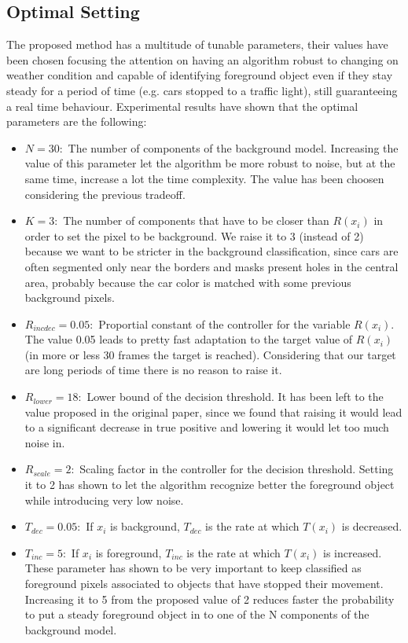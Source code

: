 \subsection{Optimal Setting}
The proposed method has a multitude of tunable parameters, their values have been chosen focusing the attention on having an algorithm robust to changing on weather condition and capable of identifying foreground object even if they stay steady for a period of time (e.g. cars stopped to a traffic light), still guaranteeing a real time behaviour. \newline
Experimental results have shown that the optimal parameters are the following:
\begin{itemize}
\item $N = 30:$ The number of components of the
background model. Increasing the value of this parameter let the algorithm be more robust to noise, but at the same time, increase a lot the time complexity. The value has been choosen considering the previous tradeoff.
\item $K = 3:$ The number of components that have to be closer than $R(x_i)$ in order to set the pixel to be background. We raise it to 3 (instead of 2) because we want to be stricter in the background classification, since cars are often segmented only near the borders and masks present holes in the central area, probably because the car color is matched with some previous background pixels.
\item $R_{incdec} = 0.05:$ Proportial constant of the controller for the variable $R(x_i)$. The value 0.05 leads to pretty fast adaptation to the target value of $R(x_i)$ (in more or less 30 frames the target is reached). Considering that our target are long periods of time there is no reason to raise it.
\item $R_{lower}=18:$ Lower bound of the decision threshold. It has been left to the value proposed in the original paper, since we found that raising it would lead to a significant decrease in true positive and lowering it would let too much noise in.
\item $R_{scale}=2:$ Scaling factor in the controller for the decision threshold. Setting it to 2 has shown to let the algorithm recognize better the foreground object while introducing very low noise.
\item $T_{dec} = 0.05:$ If $x_i$ is background, $T_{dec}$ is the rate at which $T(x_i)$ is decreased.
\item $T_{inc} = 5:$ If $x_i$ is foreground, $T_{inc}$ is the rate at which $T(x_i)$ is increased. These parameter has shown to be very important to keep classified as foreground pixels associated to objects that have stopped their movement. Increasing it to 5 from the proposed value of 2 reduces faster the probability to put a steady foreground object in to one of the N components of the background model.

\end{itemize}

